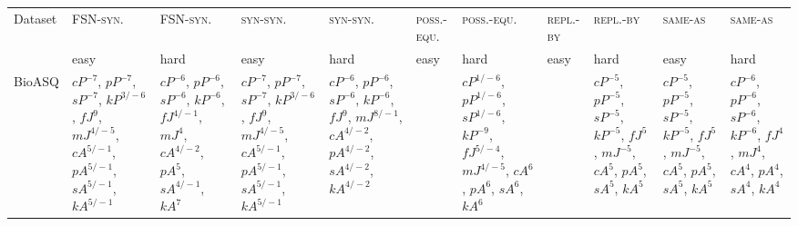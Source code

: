 \documentclass[letterpaper]{article} %
\newcommand{\dataset}[1]{\textsc{#1}}
\begin{document}
\begin{sidewaystable*}
    \centering
    \small
    \begin{tabular}{l l l l l l l l l l l }
    \toprule
         Dataset & \dataset{FSN-syn.} & \dataset{FSN-syn.} & \dataset{syn-syn.} & \dataset{syn-syn.}& \dataset{poss.-equ.} & \dataset{poss.-equ.} & \dataset{repl.-by} & \dataset{repl.-by} & \dataset{same-as} & \dataset{same-as} \\
& easy & hard & easy & hard& easy & hard & easy & hard & easy & hard \\ 
         \midrule
\multirow{10}{1.7cm}{BioASQ} & \multirow{10}{1.7cm}{$cP^{-7}$, $pP^{-7}$, $sP^{-7}$, $kP^{3/-6}$, $fJ^{9}$, $mJ^{4/-5}$, $cA^{5/-1}$, $pA^{5/-1}$, $sA^{5/-1}$, $kA^{5/-1}$} & \multirow{10}{1.7cm}{$cP^{-6}$, $pP^{-6}$, $sP^{-6}$, $kP^{-6}$, $fJ^{4/-1}$, $mJ^{4}$, $cA^{4/-2}$, $pA^{5}$, $sA^{4/-1}$, $kA^{7}$} & \multirow{10}{1.7cm}{$cP^{-7}$, $pP^{-7}$, $sP^{-7}$, $kP^{3/-6}$, $fJ^{9}$, $mJ^{4/-5}$, $cA^{5/-1}$, $pA^{5/-1}$, $sA^{5/-1}$, $kA^{5/-1}$} & \multirow{10}{1.7cm}{$cP^{-6}$, $pP^{-6}$, $sP^{-6}$, $kP^{-6}$, $fJ^{9}$, $mJ^{8/-1}$, $cA^{4/-2}$, $pA^{4/-2}$, $sA^{4/-2}$, $kA^{4/-2}$} & \multirow{10}{1.7cm}{} & \multirow{10}{1.7cm}{$cP^{1/-6}$, $pP^{1/-6}$, $sP^{1/-6}$, $kP^{-9}$, $fJ^{5/-4}$, $mJ^{4/-5}$, $cA^{6}$, $pA^{6}$, $sA^{6}$, $kA^{6}$} & \multirow{10}{1.7cm}{} & \multirow{10}{1.7cm}{$cP^{-5}$, $pP^{-5}$, $sP^{-5}$, $kP^{-5}$, $fJ^{5}$, $mJ^{-5}$, $cA^{5}$, $pA^{5}$, $sA^{5}$, $kA^{5}$} & \multirow{10}{1.7cm}{$cP^{-5}$, $pP^{-5}$, $sP^{-5}$, $kP^{-5}$, $fJ^{5}$, $mJ^{-5}$, $cA^{5}$, $pA^{5}$, $sA^{5}$, $kA^{5}$} & \multirow{10}{1.7cm}{$cP^{-6}$, $pP^{-6}$, $sP^{-6}$, $kP^{-6}$, $fJ^{4}$, $mJ^{4}$, $cA^{4}$, $pA^{4}$, $sA^{4}$, $kA^{4}$} \\ \\ \\ \\ \\ \\ \\ \\ \\ \\
\midrule

\end{tabular}
\end{sidewaystable*}
\end{document}
